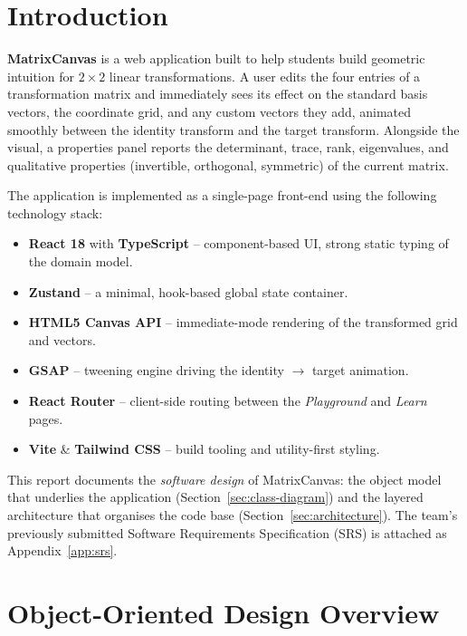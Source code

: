 \documentclass[11pt,a4paper]{article}
\begin{document}
\section{Introduction}

\textbf{MatrixCanvas} is a web application built to help students build geometric
intuition for $2 \times 2$ linear transformations. A user edits the four entries
of a transformation matrix and immediately sees its effect on the standard basis
vectors, the coordinate grid, and any custom vectors they add, animated smoothly
between the identity transform and the target transform. Alongside the visual,
a properties panel reports the determinant, trace, rank, eigenvalues, and
qualitative properties (invertible, orthogonal, symmetric) of the current matrix.

The application is implemented as a single-page front-end using the following
technology stack:

\begin{itemize}[nosep]
  \item \textbf{React 18} with \textbf{TypeScript} -- component-based UI, strong static typing of the domain model.
  \item \textbf{Zustand} -- a minimal, hook-based global state container.
  \item \textbf{HTML5 Canvas API} -- immediate-mode rendering of the transformed grid and vectors.
  \item \textbf{GSAP} -- tweening engine driving the identity $\rightarrow$ target animation.
  \item \textbf{React Router} -- client-side routing between the \emph{Playground} and \emph{Learn} pages.
  \item \textbf{Vite} \& \textbf{Tailwind CSS} -- build tooling and utility-first styling.

\end{itemize}

This report documents the \emph{software design} of MatrixCanvas: the object
model that underlies the application (Section~\ref{sec:class-diagram}) and the
layered architecture that organises the code base (Section~\ref{sec:architecture}).
The team's previously submitted Software Requirements Specification (SRS) is
attached as Appendix~\ref{app:srs}.

\section{Object-Oriented Design Overview}
\end{document}
